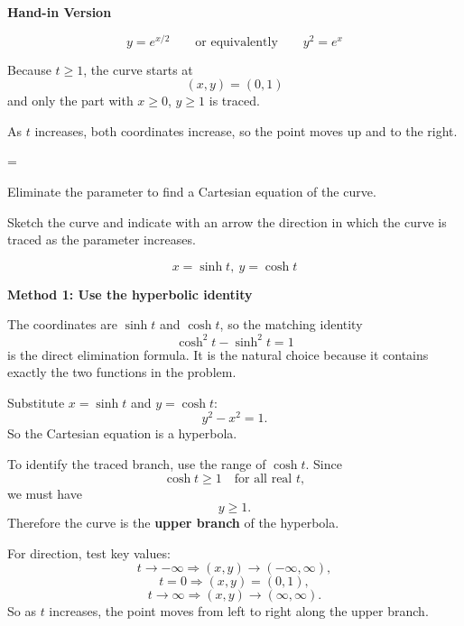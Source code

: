 \documentclass[a4paper,12pt,twocolumn]{article}
\newlength{\problemnumberwidth}
\newenvironment{solutionbox}{\begin{framed}}{\end{framed}}
\newcommand{\problem}[3]{%
  \Needspace{10\baselineskip}%
  \phantomsection\label{#1}%
  \par\vspace{0.8em}%
  \noindent
  \hangindent=\problemnumberwidth
  \hangafter=1
  \makebox[\problemnumberwidth][l]{\textbf{#2.}}#3\par
}
\begin{document}
\begin{solutionbox}
\textbf{Hand-in Version}

\[
\boxed{y=e^{x/2}}
\qquad\text{or equivalently}\qquad
\boxed{y^2=e^x}
\]

Because \(t\ge 1\), the curve starts at
\[
(x,y)=(0,1)
\]
and only the part with \(x\ge 0\), \(y\ge 1\) is traced.

As \(t\) increases, both coordinates increase, so the point moves up and to the right.
\end{solutionbox}

\problem{prob:10-1-22}{22}{%
\begin{subparts}
\item Eliminate the parameter to find a Cartesian equation of the curve.
\item Sketch the curve and indicate with an arrow the direction in which the curve is traced as the parameter increases.
\end{subparts}
\[
x=\sinh t,\ y=\cosh t
\]}

\begin{solutionbox}
\textbf{Method 1: Use the hyperbolic identity}

\begin{steps}
\item The coordinates are \(\sinh t\) and \(\cosh t\), so the matching identity
\[
\cosh^2 t-\sinh^2 t=1
\]
is the direct elimination formula. It is the natural choice because it contains exactly the two functions in the problem.

\item Substitute \(x=\sinh t\) and \(y=\cosh t\):
\[
y^2-x^2=1.
\]
So the Cartesian equation is a hyperbola.

\item To identify the traced branch, use the range of \(\cosh t\). Since
\[
\cosh t\ge 1 \quad \text{for all real } t,
\]
we must have
\[
y\ge 1.
\]
Therefore the curve is the \textbf{upper branch} of the hyperbola.

\item For direction, test key values:
\[
t\to-\infty \Longrightarrow (x,y)\to(-\infty,\infty),
\]
\[
t=0 \Longrightarrow (x,y)=(0,1),
\]
\[
t\to\infty \Longrightarrow (x,y)\to(\infty,\infty).
\]
So as \(t\) increases, the point moves from left to right along the upper branch.
\end{steps}
\end{solutionbox}
\end{document}

